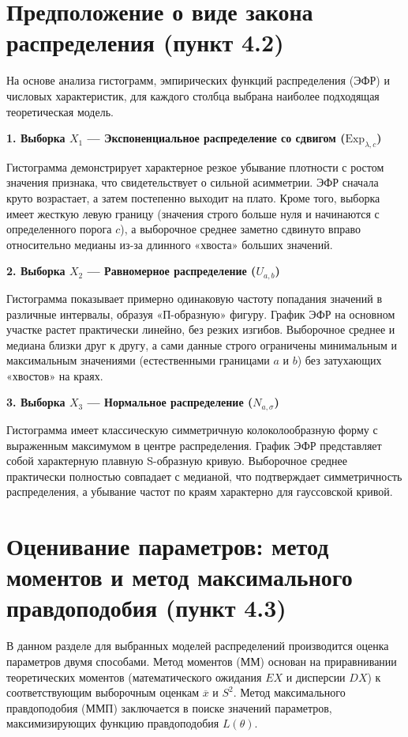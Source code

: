 \documentclass[a4paper,12pt]{article}
\begin{document}
\newpage

\section{Предположение о виде закона распределения (пункт 4.2)}

На основе анализа гистограмм, эмпирических функций распределения (ЭФР) и числовых характеристик, для каждого столбца выбрана наиболее подходящая теоретическая модель.

\textbf{1. Выборка $X_1$ — Экспоненциальное распределение со сдвигом ($\text{Exp}_{\lambda, c}$)}

Гистограмма демонстрирует характерное резкое убывание плотности с ростом значения признака, что свидетельствует о сильной асимметрии. ЭФР сначала круто возрастает, а затем постепенно выходит на плато. Кроме того, выборка имеет жесткую левую границу (значения строго больше нуля и начинаются с определенного порога $c$), а выборочное среднее заметно сдвинуто вправо относительно медианы из-за длинного «хвоста» больших значений.

\textbf{2. Выборка $X_2$ — Равномерное распределение ($U_{a, b}$)}

Гистограмма показывает примерно одинаковую частоту попадания значений в различные интервалы, образуя «П-образную» фигуру. График ЭФР на основном участке растет практически линейно, без резких изгибов. Выборочное среднее и медиана близки друг к другу, а сами данные строго ограничены минимальным и максимальным значениями (естественными границами $a$ и $b$) без затухающих «хвостов» на краях.

\textbf{3. Выборка $X_3$ — Нормальное распределение ($N_{a, \sigma}$)}

Гистограмма имеет классическую симметричную колоколообразную форму с выраженным максимумом в центре распределения. График ЭФР представляет собой характерную плавную S-образную кривую. Выборочное среднее практически полностью совпадает с медианой, что подтверждает симметричность распределения, а убывание частот по краям характерно для гауссовской кривой.

\newpage

\section{Оценивание параметров: метод моментов и метод максимального правдоподобия (пункт 4.3)}

В данном разделе для выбранных моделей распределений производится оценка параметров двумя способами. Метод моментов (ММ) основан на приравнивании теоретических моментов (математического ожидания $EX$ и дисперсии $DX$) к соответствующим выборочным оценкам $\overline{x}$ и $S^2$. Метод максимального правдоподобия (ММП) заключается в поиске значений параметров, максимизирующих функцию правдоподобия $L(\theta)$.
\end{document}
